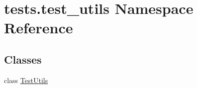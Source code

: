 \hypertarget{namespacetests_1_1test__utils}{}\section{tests.\+test\+\_\+utils Namespace Reference}
\label{namespacetests_1_1test__utils}
\subsection*{Classes}
\begin{DoxyCompactItemize}
\item 
class \hyperlink{classtests_1_1test__utils_1_1TestUtils}{Test\+Utils}
\end{DoxyCompactItemize}
